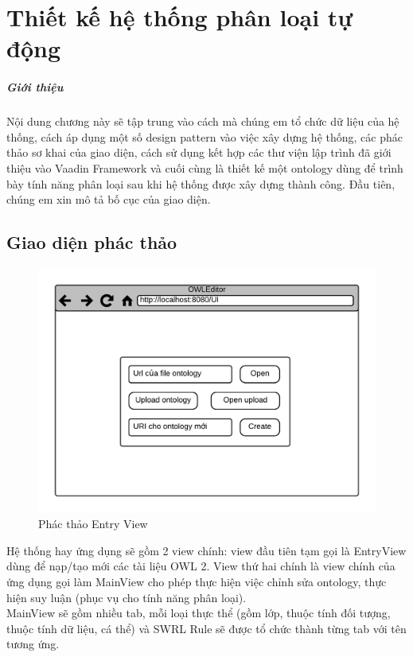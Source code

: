 \chapter{Thiết kế hệ thống phân loại tự động}
\paragraph{Giới thiệu} Nội dung chương này sẽ tập trung vào cách mà chúng em tổ chức dữ liệu của hệ thống, cách áp dụng một số design pattern vào việc xây dựng hệ thống, các phác thảo sơ khai của giao diện, cách sử dụng kết hợp các thư viện lập trình đã giới thiệu vào Vaadin Framework và cuối cùng là thiết kế một ontology dùng để trình bày tính năng phân loại sau khi hệ thống được xây dựng thành công. Đầu tiên, chúng em xin mô tả bố cục của giao diện.
\section{Giao diện phác thảo}
\begin{figure}[ht!]
	\centering
	\includegraphics[width=130mm]{Figures/ui_entryview.png}
	\caption{Phác thảo Entry View \label{overflow}}
\end{figure}
Hệ thống hay ứng dụng sẽ gồm 2 view chính: view đầu tiên tạm gọi là EntryView dùng để nạp/tạo mới các tài liệu OWL 2. View thứ hai chính là view chính của ứng dụng gọi làm MainView cho phép thực hiện việc chỉnh sửa ontology, thực hiện suy luận (phục vụ cho tính năng phân loại). 
\\
MainView sẽ gồm nhiều tab, mỗi loại thực thể (gồm lớp, thuộc tính đối tượng, thuộc tính dữ liệu, cá thể) và SWRL Rule sẽ được tổ chức thành từng tab với tên tương ứng. 
